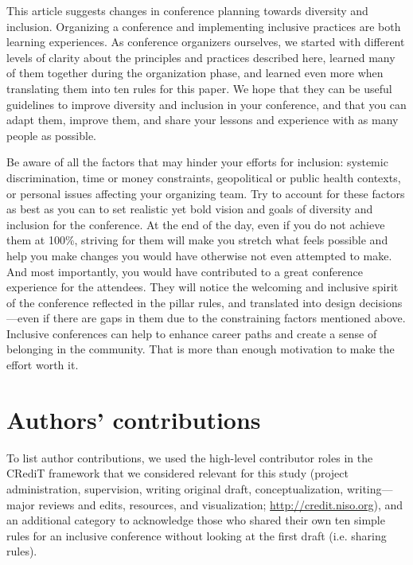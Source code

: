 \documentclass[10pt,letterpaper]{article}
\begin{document}
This article suggests changes in conference planning towards diversity and inclusion. 
Organizing a conference and implementing inclusive practices are both learning experiences.
As conference organizers ourselves, we started with different levels of clarity about the principles and practices described here, learned many of them together during the organization phase, and learned even more when translating them into ten rules for this paper. 
We hope that they can be useful guidelines to improve diversity and inclusion in your conference, and that you can adapt them, improve them, and share your lessons and experience with as many people as possible. 

Be aware of all the factors that may hinder your efforts for inclusion: systemic discrimination, time or money constraints, geopolitical or public health contexts, or personal issues affecting your organizing team. 
Try to account for these factors as best as you can to set realistic yet bold vision and goals of diversity and inclusion for the conference.
At the end of the day, even if you do not achieve them at 100\%, striving for them will make you stretch what feels possible and help you make changes you would have otherwise not even attempted to make. 
And most importantly, you would have contributed to a great conference experience for the attendees. 
They will notice the welcoming and inclusive spirit of the conference reflected in the pillar rules, and translated into design decisions—even if there are gaps in them due to the constraining factors mentioned above. 
Inclusive conferences can help to enhance career paths and create a sense of belonging in the community. 
That is more than enough motivation to make the effort worth it. 


\section*{Authors' contributions}

To list author contributions, we used the high-level contributor roles in the CRediT framework that we considered relevant for this study (project administration, supervision, writing original draft, conceptualization, writing—major reviews and edits, resources, and visualization; \url{http://credit.niso.org}), and an additional category to acknowledge those who shared their own ten simple rules for an inclusive conference without looking at the first draft (i.e. sharing rules).
\end{document}
